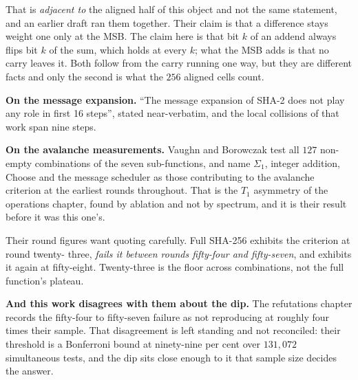 That is \emph{adjacent to} the aligned half of this object and not the same statement, and an
earlier draft ran them together. Their claim is that a difference stays weight one only at the MSB.
The claim here is that bit \(k\) of an addend always flips bit \(k\) of the sum, which holds at every
\(k\); what the MSB adds is that no carry leaves it. Both follow from the carry running one way, but
they are different facts and only the second is what the \(256\) aligned cells count.

\textbf{On the message expansion.} ``The message expansion of SHA-2 does not play any role in first
16 steps'', stated near-verbatim, and the local collisions of that work span nine steps.

\textbf{On the avalanche measurements.} Vaughn and Borowczak test all \(127\) non-empty combinations
of the seven sub-functions, and name \(\Sigma_1\), integer addition, Choose and the message scheduler
as those contributing to the avalanche criterion at the earliest rounds throughout. That is the
\(T_1\) asymmetry of the operations chapter, found by ablation and not by spectrum, and it is
their result before it was this one's.

Their round figures want quoting carefully. Full SHA-256 exhibits the criterion at round twenty-
three, \emph{fails it between rounds fifty-four and fifty-seven}, and exhibits it again at
fifty-eight. Twenty-three is the floor across combinations, not the full function's plateau.

\textbf{And this work disagrees with them about the dip.} The refutations chapter records the
fifty-four to fifty-seven failure as not reproducing at roughly four times their sample. That
disagreement is left standing and not reconciled: their threshold is a Bonferroni bound at
ninety-nine per cent over \(131{,}072\) simultaneous tests, and the dip sits close enough to it that
sample size decides the answer.
